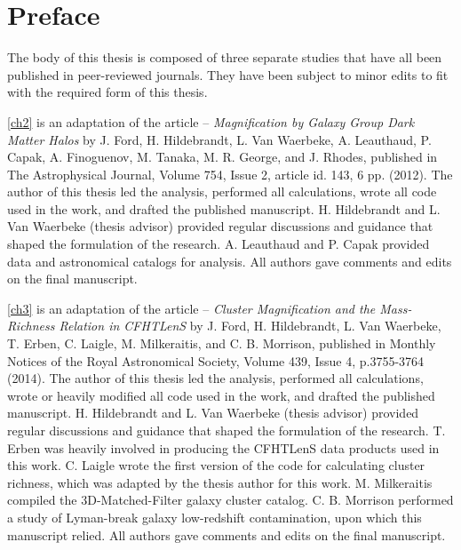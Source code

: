 
\chapter{Preface}
\label{preface}

The body of this thesis is composed of three separate studies that have all been published in peer-reviewed journals. They have been subject to minor edits to fit with the required form of this thesis. 

\autoref{ch2} is an adaptation of the article -- {\it Magnification by Galaxy Group Dark Matter Halos} by J. Ford, H. Hildebrandt, L. Van Waerbeke, A. Leauthaud, P. Capak, A. Finoguenov, M. Tanaka, M. R. George, and J. Rhodes, published in The Astrophysical Journal, Volume 754, Issue 2, article id. 143, 6 pp. (2012). The author of this thesis led the analysis, performed all calculations, wrote all code used in the work, and drafted the published manuscript. H. Hildebrandt and L. Van Waerbeke (thesis advisor) provided regular discussions and guidance that shaped the formulation of the research. A. Leauthaud and P. Capak provided data and astronomical catalogs for analysis. All authors gave comments and edits on the final manuscript.

\autoref{ch3} is an adaptation of the article -- {\it Cluster Magnification and the Mass-Richness Relation in CFHTLenS} by J. Ford, H. Hildebrandt, L. Van Waerbeke, T. Erben, C. Laigle, M. Milkeraitis, and C. B. Morrison, published in Monthly Notices of the Royal Astronomical Society, Volume 439, Issue 4, p.3755-3764 (2014). The author of this thesis led the analysis, performed all calculations, wrote or heavily modified all code used in the work, and drafted the published manuscript. H. Hildebrandt and L. Van Waerbeke (thesis advisor) provided regular discussions and guidance that shaped the formulation of the research. T. Erben was heavily involved in producing the \acs{CFHTLenS} data products used in this work. C. Laigle wrote the first version of the code for calculating cluster richness, which was adapted by the thesis author for this work. M. Milkeraitis compiled the 3D-Matched-Filter galaxy cluster catalog. C. B. Morrison performed a study of Lyman-break galaxy low-redshift contamination, upon which this manuscript relied. All authors gave comments and edits on the final manuscript.


